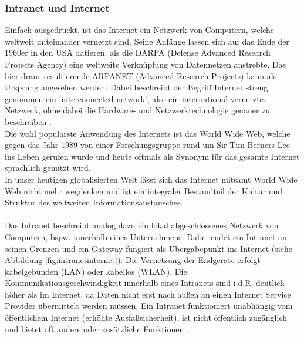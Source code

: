 \subsubsection{Intranet und Internet}\label{sec:intranetundinternet}
Einfach ausgedrückt, ist das Internet ein Netzwerk von Computern, welche weltweit miteinander vernetzt sind. Seine Anfänge lassen sich auf das Ende der 1960er in den USA datieren, als die DARPA (Defense Advanced Research Projects Agency) eine weltweite Verknüpfung von Datennetzen anstrebte. Das hier draus resultierende ARPANET (Advanced Research Projects) kann als Ursprung angesehen werden. Dabei beschreibt der Begriff Internet streng genommen ein 'interconnected network', also ein international vernetztes Netzwerk, ohne dabei die Hardware- und Netzwerktechnologie genauer zu beschreiben \cite{Safran2011}.  \\ 
Die wohl populärste Anwendung des Internets ist das World Wide Web, welche gegen das Jahr 1989 von einer Forschungsgruppe rund um Sir Tim Berners-Lee ins Leben gerufen wurde und heute oftmals als Synonym für das gesamte Internet sprachlich genutzt wird. \\ 

In unser heutigen globalisierten Welt lässt sich das Internet mitsamt World Wide Web nicht mehr wegdenken und ist ein integraler Bestandteil der Kultur und Struktur des weltweiten Informationsaustausches.
 \\ \\
 Das Intranet beschreibt analog dazu ein lokal abgeschlossenes Netzwerk von Computern, bspw. innerhalb eines Unternehmens. Dabei endet ein Intranet an seinen Grenzen und ein Gateway fungiert als Übergabepunkt ins Internet (siehe Abbildung \ref{fig:intranetinternet}). Die Vernetzung der Endgeräte erfolgt kabelgebunden (LAN) oder kabellos (WLAN). Die Kommunikationsgeschwindigkeit innerhalb eines Intranets sind i.d.R. deutlich höher als im Internet, da Daten nicht erst nach außen an einen Internet Service Provider übermittelt werden müssen. Ein Intranet funktioniert unabhängig vom öffentlichem Internet (erhöhte Ausfallsicherheit), ist nicht öffentlich zugänglich und bietet oft andere oder zusätzliche Funktionen \cite{Intranet62:online}. 
 
